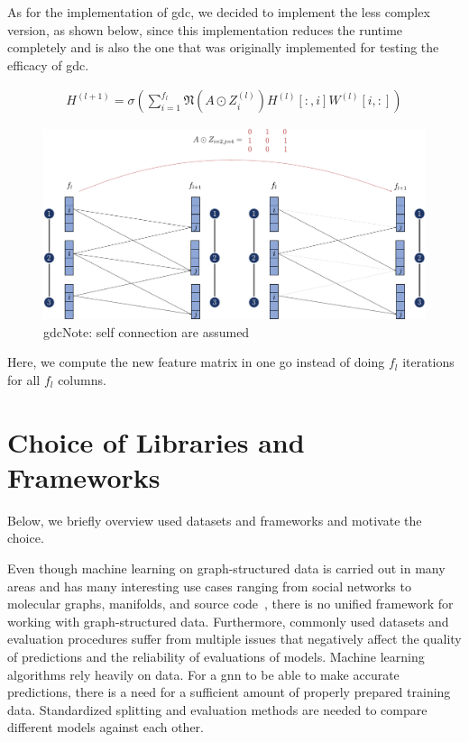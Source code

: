As for the implementation of \ac{gdc}, we decided to implement the less complex version, as shown below, since this implementation reduces the runtime completely and is also the one that was originally implemented for testing the efficacy of \ac{gdc}.

\begin{align}
    H^{(l+1)} = \sigma(\sum_{i= 1}^{f_{l}}\mathfrak{N}(A \odot Z_{i}^{(l)})H^{(l)}[:,i] W^{(l)}[i,:]) \label{eq:relaxed}
\end{align}
\begin{figure}[ht]
    \centering
    \includegraphics[width= 0.90\linewidth]{gfx/implementation/GDC-eq4.pdf}
    \caption{\Ac{gdc}Note: self connection are assumed}\label{fig:implementaion:GDC-eq4}
\end{figure}
Here, we compute the new feature matrix in one go instead of doing $f_{l}$ iterations for all $f_{l}$ columns.


\section{Choice of Libraries and Frameworks}
\label{sec:implement:frameworks}
Below, we briefly overview used datasets and frameworks and motivate the choice.

Even though machine learning on graph-structured data is carried out in many areas and has many interesting use cases ranging from social networks to molecular graphs, manifolds, and source code~\cite{Hu2020},
there is no unified framework for working with graph-structured data. Furthermore, commonly used datasets and evaluation procedures suffer from multiple issues that negatively affect the quality of predictions and the reliability of evaluations of models.
Machine learning algorithms rely heavily on data. For a \ac{gnn} to be able to make accurate predictions, there is a need for a sufficient amount of properly prepared training data. Standardized splitting and evaluation methods are needed to compare different models against each other.

